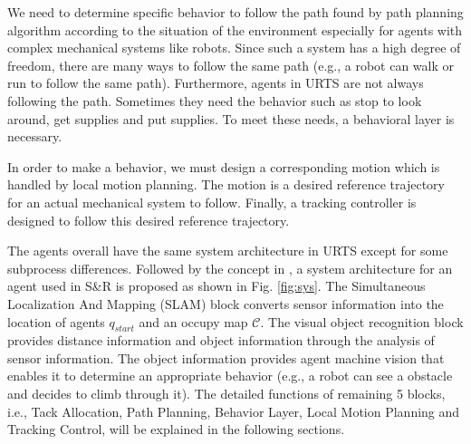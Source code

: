 \documentclass{ieeeaccess}
\begin{document}
We need to determine specific behavior to follow the path found by path planning algorithm according to the situation of the environment especially for agents with complex mechanical systems like robots. Since such a system has a high degree of freedom, there are many ways to follow the same path (e.g., a robot can walk or run to follow the same path). Furthermore, agents in URTS are not always following the path. Sometimes they need the behavior such as stop to look around, get supplies and put supplies. To meet these needs, a behavioral layer is necessary.

In order to make a behavior, we must design a corresponding motion which is handled by local motion planning. The motion is a desired reference trajectory for an actual mechanical system to follow. Finally, a tracking controller is designed to follow this desired reference trajectory.

The agents overall have the same system architecture in URTS except for some subprocess differences. Followed by the concept in \cite{paden2016survey}, a system architecture for an agent used in S\&R is proposed as shown in Fig. \ref{fig:sys}. The Simultaneous Localization And Mapping (SLAM) block converts sensor information into the location of agents $q_{start}$ and an occupy map $\mathcal{C}$. The visual object recognition block provides distance information and object information through the analysis of sensor information. The object information provides agent machine vision that enables it to determine an appropriate behavior (e.g., a robot can see a obstacle and decides to climb through it). The detailed functions of remaining 5 blocks, i.e., Tack Allocation, Path Planning, Behavior Layer, Local Motion Planning and Tracking Control, will be explained in the following sections.

\end{document}
